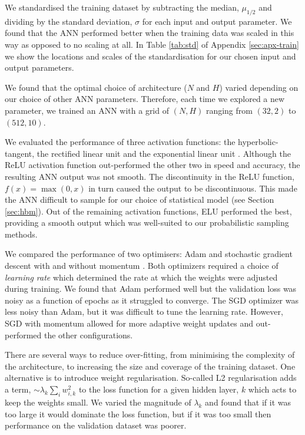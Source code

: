 \documentclass[a4paper,fleqn,usenatbib]{mnras}
\begin{document}
We standardised the training dataset by subtracting the median, $\mu_{1/2}$ and dividing by the standard deviation, $\sigma$ for each input and output parameter. We found that the ANN performed better when the training data was scaled in this way as opposed to no scaling at all. In Table \ref{tab:std} of Appendix \ref{sec:apx-train} we show the locations and scales of the standardisation for our chosen input and output parameters.

We found that the optimal choice of architecture ($N$ and $H$) varied depending on our choice of other ANN parameters. Therefore, each time we explored a new parameter, we trained an ANN with a grid of $(N,H)$ ranging from $(32, 2)$ to $(512, 10)$.

We evaluated the performance of three activation functions: the hyperbolic-tangent, the rectified linear unit \citep[ReLU;][]{Hahnloser.Sarpeshkar.ea2000, Glorot.Bordes.ea2011} and the exponential linear unit \citep[ELU;][]{Clevert.Unterthiner.ea2015}. Although the ReLU activation function out-performed the other two in speed and accuracy, the resulting ANN output was not smooth. The discontinuity in the ReLU function, $f(x) = \max(0, x)$ in turn caused the output to be discontinuous. This made the ANN difficult to sample for our choice of statistical model (see Section \ref{sec:hbm}). Out of the remaining activation functions, ELU performed the best, providing a smooth output which was well-suited to our probabilistic sampling methods.

We compared the performance of two optimisers: Adam \citep{Kingma.Ba2014} and stochastic gradient descent \citep[SGD; see e.g.][]{Ruder2016} with and without momentum \citep{Qian1999}. Both optimizers required a choice of \emph{learning rate} which determined the rate at which the weights were adjusted during training. We found that Adam performed well but the validation loss was noisy as a function of epochs as it struggled to converge. The SGD optimizer was less noisy than Adam, but it was difficult to tune the learning rate. However, SGD with momentum allowed for more adaptive weight updates and out-performed the other configurations.

There are several ways to reduce over-fitting, from minimising the complexity of the architecture, to increasing the size and coverage of the training dataset. One alternative is to introduce weight regularisation. So-called L2 regularisation adds a term, $\sim \lambda_k \sum_i w_{i, k}^2$ to the loss function for a given hidden layer, $k$ which acts to keep the weights small. We varied the magnitude of $\lambda_k$ and found that if it was too large it would dominate the loss function, but if it was too small then performance on the validation dataset was poorer.
\end{document}
